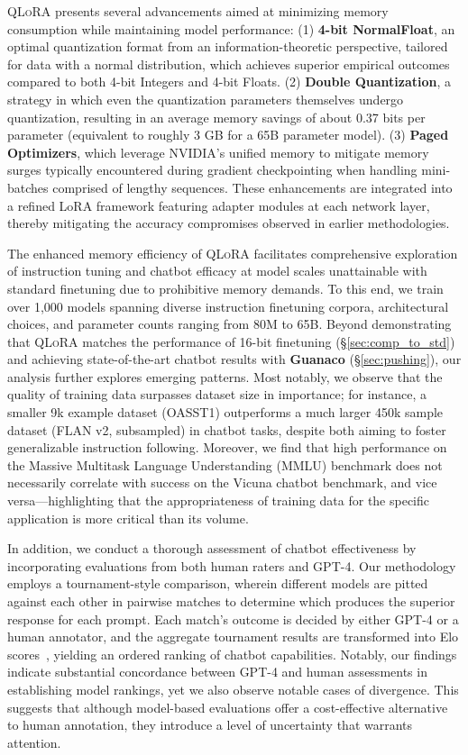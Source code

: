 \textsc{QLoRA} presents several advancements aimed at minimizing memory consumption while maintaining model performance: (1) \textbf{4-bit NormalFloat}, an optimal quantization format from an information-theoretic perspective, tailored for data with a normal distribution, which achieves superior empirical outcomes compared to both 4-bit Integers and 4-bit Floats. (2) \textbf{Double Quantization}, a strategy in which even the quantization parameters themselves undergo quantization, resulting in an average memory savings of about 0.37 bits per parameter (equivalent to roughly 3 GB for a 65B parameter model). (3) \textbf{Paged Optimizers}, which leverage NVIDIA's unified memory to mitigate memory surges typically encountered during gradient checkpointing when handling mini-batches comprised of lengthy sequences. These enhancements are integrated into a refined LoRA framework featuring adapter modules at each network layer, thereby mitigating the accuracy compromises observed in earlier methodologies.

The enhanced memory efficiency of \textsc{QLoRA} facilitates comprehensive exploration of instruction tuning and chatbot efficacy at model scales unattainable with standard finetuning due to prohibitive memory demands. To this end, we train over 1,000 models spanning diverse instruction finetuning corpora, architectural choices, and parameter counts ranging from 80M to 65B. Beyond demonstrating that \textsc{QLoRA} matches the performance of 16-bit finetuning (\S\ref{sec:comp_to_std}) and achieving state-of-the-art chatbot results with \textbf{Guanaco} (\S\ref{sec:pushing}), our analysis further explores emerging patterns. Most notably, we observe that the quality of training data surpasses dataset size in importance; for instance, a smaller 9k example dataset (OASST1) outperforms a much larger 450k sample dataset (FLAN v2, subsampled) in chatbot tasks, despite both aiming to foster generalizable instruction following. Moreover, we find that high performance on the Massive Multitask Language Understanding (MMLU) benchmark does not necessarily correlate with success on the Vicuna chatbot benchmark, and vice versa—highlighting that the appropriateness of training data for the specific application is more critical than its volume.

In addition, we conduct a thorough assessment of chatbot effectiveness by incorporating evaluations from both human raters and GPT-4. Our methodology employs a tournament-style comparison, wherein different models are pitted against each other in pairwise matches to determine which produces the superior response for each prompt. Each match’s outcome is decided by either GPT-4 or a human annotator, and the aggregate tournament results are transformed into Elo scores~\citep{elo1967proposed, elo1978rating}, yielding an ordered ranking of chatbot capabilities. Notably, our findings indicate substantial concordance between GPT-4 and human assessments in establishing model rankings, yet we also observe notable cases of divergence. This suggests that although model-based evaluations offer a cost-effective alternative to human annotation, they introduce a level of uncertainty that warrants attention.

